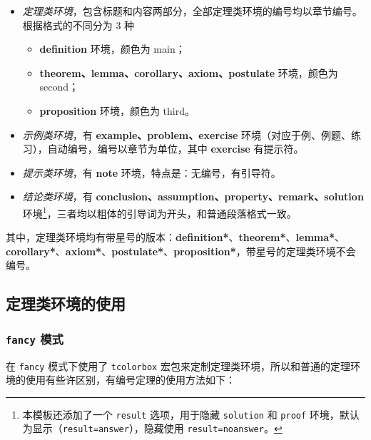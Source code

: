 \documentclass[lang=cn,newtx,10pt,scheme=chinese,pad,twocol]{zznote}
\begin{document}
\begin{itemize}
	\item \textit{定理类环境}，包含标题和内容两部分，全部定理类环境的编号均以章节编号。根据格式的不同分为 3 种
	      \begin{itemize}
		      \item \textcolor{main}{\textbf{definition}} 环境，颜色为 \textcolor{main}{main}；
		      \item \textcolor{second}{\textbf{theorem、lemma、corollary、axiom、postulate}} 环境，颜色为 \textcolor{second} {second}；
		      \item \textcolor{third}{\textbf{proposition}} 环境，颜色为 \textcolor{third}{third}。
	      \end{itemize}
	\item \textit{示例类环境}，有 \textbf{example、problem、exercise} 环境（对应于例、例题、练习），自动编号，编号以章节为单位，其中 \textbf{exercise} 有提示符。
	\item \textit{提示类环境}，有 \textbf{note} 环境，特点是：无编号，有引导符。
	\item \textit{结论类环境}，有 \textbf{conclusion、assumption、property、remark、solution} 环境\footnote{本模板还添加了一个 \lstinline|result| 选项，用于隐藏 \lstinline{solution} 和 \lstinline{proof} 环境，默认为显示（\lstinline{result=answer}），隐藏使用 \lstinline{result=noanswer}。}，三者均以粗体的引导词为开头，和普通段落格式一致。
\end{itemize}

其中，定理类环境均有带星号的版本：\textcolor{main}{\textbf{definition*}}、\textcolor{second}{\textbf{theorem*}}、\textcolor{second}{\textbf{lemma*}}、\textcolor{second}{\textbf{corollary*}}、\textcolor{second}{\textbf{axiom*}}、\textcolor{second}{\textbf{postulate*}}、\textcolor{third}{\textbf{proposition*}}，带星号的定理类环境不会编号。

\subsection{定理类环境的使用}

\subsubsection{\texttt{fancy} 模式}

在 \lstinline{fancy} 模式下使用了 \lstinline{tcolorbox} 宏包来定制定理类环境，所以和普通的定理环境的使用有些许区别，有编号定理的使用方法如下：
\end{document}
